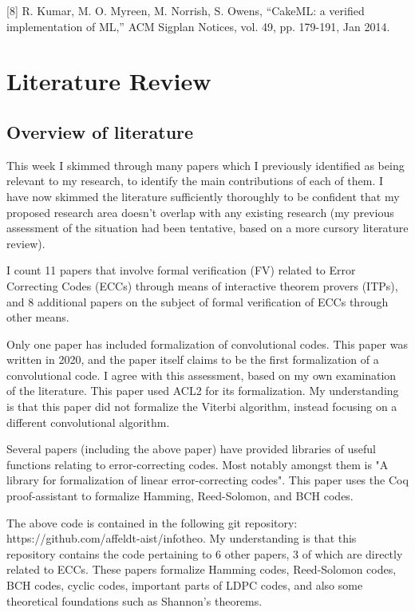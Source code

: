 \documentclass{article}
\begin{document}
[8]    R. Kumar, M. O. Myreen, M. Norrish, S. Owens, “CakeML: a verified implementation of ML,” ACM Sigplan Notices, vol. 49, pp. 179-191, Jan 2014.

\section{Literature Review}

\subsection{Overview of literature}

This week I skimmed through many papers which I previously identified as being relevant to my research, to identify the main contributions of each of them. I have now skimmed the literature sufficiently thoroughly to be confident that my proposed research area doesn't overlap with any existing research (my previous assessment of the situation had been tentative, based on a more cursory literature review).

I count 11 papers that involve formal verification (FV) related to Error Correcting Codes (ECCs) through means of interactive theorem provers (ITPs), and 8 additional papers on the subject of formal verification of ECCs through other means.

Only one paper has included formalization of convolutional codes. This paper was written in 2020, and the paper itself claims to be the first formalization of a convolutional code. I agree with this assessment, based on my own examination of the literature. This paper used ACL2 for its formalization. My understanding is that this paper did not formalize the Viterbi algorithm, instead focusing on a different convolutional algorithm.

Several papers (including the above paper) have provided libraries of useful functions relating to error-correcting codes. Most notably amongst them is "A library for formalization of linear error-correcting codes". This paper uses the Coq proof-assistant to formalize Hamming, Reed-Solomon, and BCH codes.

The above code is contained in the following git repository: https://github.com/affeldt-aist/infotheo. My understanding is that this repository contains the code pertaining to 6 other papers, 3 of which are directly related to ECCs. These papers formalize Hamming codes, Reed-Solomon codes, BCH codes, cyclic codes, important parts of LDPC codes, and also some theoretical foundations such as Shannon's theorems.
\end{document}
